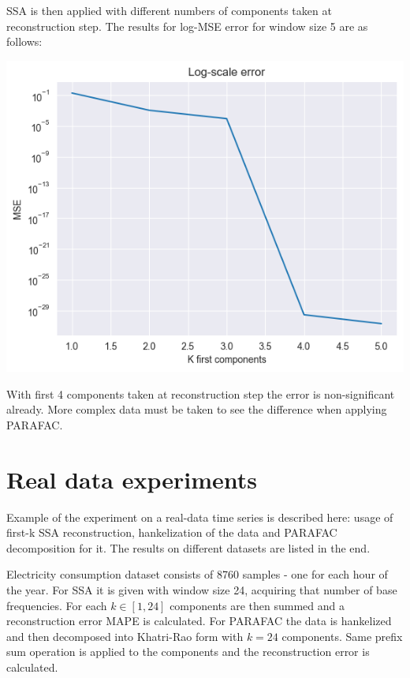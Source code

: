 \documentclass{article}
\begin{document}
SSA is then applied with different numbers of components taken at reconstruction step. The results for log-MSE error for window size 5 are as follows:

\includegraphics[scale=0.7]{./images/fig2.png}

With first 4 components taken at reconstruction step the error is non-significant already. More complex data must be taken to see the difference when applying PARAFAC.

\section{Real data experiments}

Example of the experiment on a real-data time series is described here: usage of first-k SSA reconstruction, hankelization of the data and PARAFAC decomposition for it. The results on different datasets are listed in the end.

Electricity consumption dataset consists of 8760 samples - one for each hour of the year. For SSA it is given with window size 24, acquiring that number of base frequencies. For each \(k \in [1, 24]\) components are then summed and a reconstruction error MAPE is calculated. For PARAFAC the data is hankelized and then decomposed into Khatri-Rao form with \(k = 24\) components. Same prefix sum operation is applied to the components and the reconstruction error is calculated.
\end{document}
